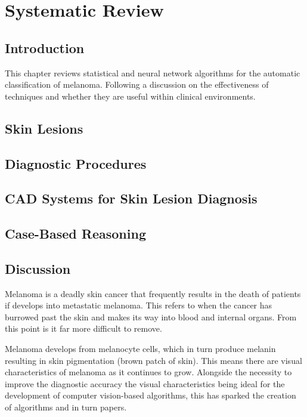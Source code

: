 \cleardoublepage
\chapter{Systematic Review}

\section{Introduction}
This chapter reviews statistical and neural network algorithms for the automatic classification of melanoma. Following a discussion on the effectiveness of techniques and whether they are useful within clinical environments. 


\section{Skin Lesions}

\section{Diagnostic Procedures}

\section{CAD Systems for Skin Lesion Diagnosis}

\section{Case-Based Reasoning}

\section{Discussion}

Melanoma is a deadly skin cancer that frequently results in the death of patients if develops into metastatic melanoma. This refers to when the cancer has burrowed past the skin and makes its way into blood and internal organs. From this point is it far more difficult to remove.

Melanoma develops from melanocyte cells, which in turn produce melanin resulting in skin pigmentation (brown patch of skin). This means there are visual characteristics of melanoma as it continues to grow. Alongside the necessity to improve the diagnostic accuracy the visual characteristics being ideal for the development of computer vision-based algorithms, this has sparked the creation of algorithms and in turn papers.

